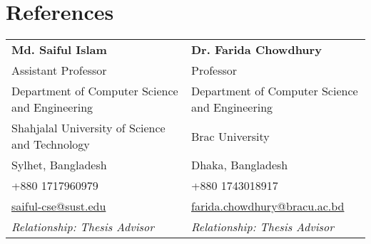 \section{\textbf{References}}
\vspace{-0.4mm}
\small{
\begin{tabular}{@{} p{0.5\linewidth} | p{0.5\linewidth} @{}}

    \textbf{Md. Saiful Islam} & \hspace{4mm}\textbf{Dr. Farida Chowdhury} \\
    \small{Assistant Professor} & \hspace{4mm}\small{Professor} \\
    \small{Department of Computer Science and Engineering} & \hspace{4mm}\small{Department of Computer Science and Engineering} \\
    \small{Shahjalal University of Science and Technology} & \hspace{4mm}\small{Brac University} \\
    \small{Sylhet, Bangladesh} & \hspace{4mm}\small{Dhaka, Bangladesh} \\
    \small{+880 1717960979} & \hspace{4mm}\small{+880 1743018917} \\
    \small{\href{mailto:saiful-cse@sust.edu}{saiful-cse@sust.edu}} & \hspace{4mm}\small{\href{mailto:farida.chowdhury@bracu.ac.bd}{farida.chowdhury@bracu.ac.bd}} \\
    \small{\textit{Relationship: Thesis Advisor}} & \hspace{4mm}\small{\textit{Relationship: Thesis Advisor}} 
    \\ 
    

\end{tabular}}
